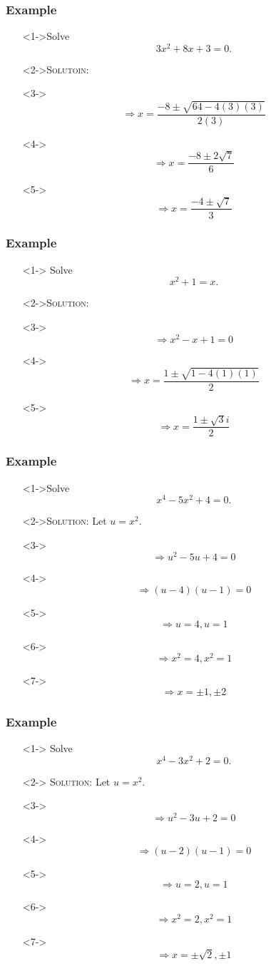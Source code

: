 \documentclass[handout]{beamer}
\begin{document}
\begin{frame}
	\frametitle{Example}
	\begin{enumerate}
		\item[]<1->Solve \[ 3x^{2}+8x+3=0. \]
		\item[]<2->\textsc{Solutoin:}
		\item[]<3->\[ \Rightarrow x=\frac{-8 \pm \sqrt{64-4(3)(3)}}{2(3)} \] 
		\item[]<4-> \[ \Rightarrow x=\frac{-8 \pm 2\sqrt{7}}{6} \]
		\item[]<5-> \[ \Rightarrow x=\frac{-4 \pm \sqrt{7}}{3} \]
	\end{enumerate}
\end{frame}

\begin{frame}
	\frametitle{Example} 
	\begin{enumerate}
		\item[]<1-> Solve \[ x^{2}+1=x. \] 
		\item[]<2->\textsc{Solution:} 
		\item[]<3-> \[ \Rightarrow x^{2}-x+1=0 \] 
		\item[]<4-> \[ \Rightarrow x=\frac{1\pm \sqrt{1-4(1)(1)}}{2}\] 
		\item[]<5-> \[ \Rightarrow x=\frac{1 \pm \sqrt{3} i}{2}\] 
	\end{enumerate} 
\end{frame}

\begin{frame}
	\frametitle{Example}
	\begin{enumerate}
		\item[]<1->Solve \[ x^{4}-5x^{2}+4=0. \] 
		\item[]<2->\textsc{Solution:} Let $u=x^{2}$.  
		\item[]<3-> \[ \Rightarrow u^{2}-5u+4=0 \] 
		\item[]<4->\[ \Rightarrow (u-4)(u-1)=0\] 
		\item[]<5->\[ \Rightarrow u=4, u=1 \] 
		\item[]<6-> \[ \Rightarrow x^{2}=4, x^{2}=1 \] 
		\item[]<7-> \[ \Rightarrow x=\pm 1, \pm 2 \]
	\end{enumerate}
\end{frame}

\begin{frame}
	\frametitle{Example}
	\begin{enumerate}
		\item[]<1-> Solve \[ x^{4}-3x^{2}+2=0. \] 
		\item[]<2-> \textsc{Solution:} Let $u=x^{2}$. 
		\item[]<3-> \[ \Rightarrow u^{2}-3u+2=0 \] 
		\item[]<4-> \[ \Rightarrow (u-2)(u-1)=0 \] 
		\item[]<5-> \[ \Rightarrow u=2, u=1 \] 
		\item[]<6-> \[ \Rightarrow x^{2}=2, x^{2}=1 \] 
		\item[]<7-> \[ \Rightarrow x=\pm \sqrt{2}, \pm 1 \]
	\end{enumerate} 
\end{frame}
\end{document}

